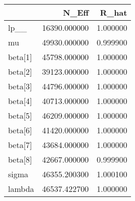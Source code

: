 \begin{tabular}{lrr}
\toprule
 & N_Eff & R_hat \\
\midrule
lp__ & 16390.000000 & 1.000000 \\
mu & 49930.000000 & 0.999900 \\
beta[1] & 45798.000000 & 1.000000 \\
beta[2] & 39123.000000 & 1.000000 \\
beta[3] & 44796.000000 & 1.000000 \\
beta[4] & 40713.000000 & 1.000000 \\
beta[5] & 46209.000000 & 1.000000 \\
beta[6] & 41420.000000 & 1.000000 \\
beta[7] & 43684.000000 & 1.000000 \\
beta[8] & 42667.000000 & 0.999900 \\
sigma & 46355.200300 & 1.000100 \\
lambda & 46537.422700 & 1.000000 \\
\bottomrule
\end{tabular}
